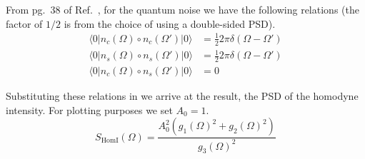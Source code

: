 \documentclass[aps,pra,superscriptaddress,reprint,nofootinbib]{revtex4-1}
\begin{document}
From pg.~38 of Ref.~\cite{Danilishin_2012}, for the quantum noise we have the following relations (the factor of $1/2$ is from the choice of using a double-sided PSD).
\begin{align*}
\langle0|n_c(\Omega) \circ n_c(\Omega')|0\rangle &= \frac{1}{2} 2 \pi \delta(\Omega - \Omega') \\
\langle0|n_s(\Omega) \circ n_s(\Omega')|0\rangle &= \frac{1}{2} 2 \pi \delta(\Omega - \Omega') \\
\langle0|n_c(\Omega) \circ n_s(\Omega')|0\rangle &= 0
\end{align*}

Substituting these relations in we arrive at the result, the PSD of the homodyne intensity. For plotting purposes we set $A_0 = 1$.
$$S_\mathrm{HomI}(\Omega) = \frac{A_0^2 \left( g_1(\Omega)^2 + g_2(\Omega)^2 \right)}{g_3(\Omega)^2}$$


\nocite{*}


\end{document}

